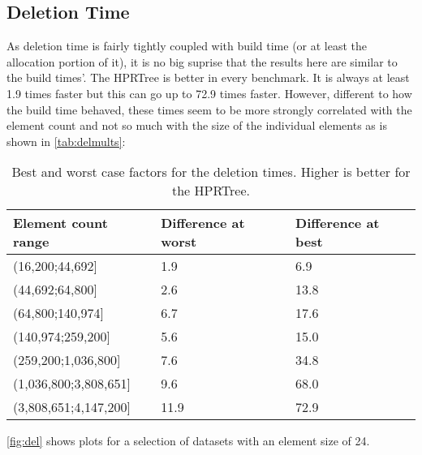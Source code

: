 \subsection{Deletion Time}

As deletion time is fairly tightly coupled with build time (or at least the allocation portion of it), it is no big suprise that the results here are similar to the build times'. The \acs{HPRTree} is better in every benchmark. It is always at least 1.9 times faster but this can go up to 72.9 times faster. However, different to how the build time behaved, these times seem to be more strongly correlated with the element count and not so much with the size of the individual elements as is shown in \autoref{tab:delmults}:

\begin{table}[H]
    \centering
    \begin{tabular}{l|l|l}
        Element count range     & Difference at worst & Difference at best \\ \hline
        (16,200;44,692{]}       & 1.9                 & 6.9                \\ \hline
        (44,692;64,800{]}       & 2.6                 & 13.8               \\ \hline
        (64,800;140,974{]}      & 6.7                 & 17.6               \\ \hline
        (140,974;259,200{]}     & 5.6                 & 15.0               \\ \hline
        (259,200;1,036,800{]}   & 7.6                 & 34.8               \\ \hline
        (1,036,800;3,808,651{]} & 9.6                 & 68.0               \\ \hline
        (3,808,651;4,147,200{]} & 11.9                & 72.9
    \end{tabular}
    \caption[Best and worst case factors for the deletion times.]{Best and worst case factors for the deletion times. Higher is better for the \acs{HPRTree}.}
    \label{tab:delmults}
\end{table}

\autoref{fig:del} shows plots for a selection of datasets with an element size of 24.

